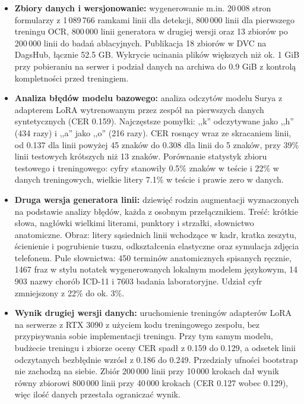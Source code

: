 \begin{itemize}
	\item \textbf{Zbiory danych i wersjonowanie:} wygenerowanie m.in.
	20\,008 stron formularzy z 1\,089\,766 ramkami linii dla detekcji,
	800\,000 linii dla pierwszego treningu OCR, 800\,000 linii generatora
	w drugiej wersji oraz 13 zbiorów po 200\,000 linii do badań ablacyjnych.
	Publikacja 18 zbiorów w DVC na DagsHub, łącznie 52.5 GB. Wykrycie ucinania plików
	większych niż ok. 1 GiB przy pobieraniu na serwer i podział danych
	na archiwa do 0.9 GiB z kontrolą kompletności przed treningiem.

	\item \textbf{Analiza błędów modelu bazowego:} analiza odczytów modelu
	Surya z adapterem LoRA wytrenowanym przez zespół na pierwszych danych
	syntetycznych (CER 0.159). Najczęstsze pomyłki: ,,k'' odczytywane jako
	,,h'' (434 razy) i ,,a'' jako ,,o'' (216 razy). CER rosnący wraz ze
	skracaniem linii, od 0.137 dla linii powyżej 45 znaków do 0.308 dla
	linii do 5 znaków, przy 39\% linii testowych krótszych niż 13 znaków.
	Porównanie statystyk zbioru testowego i treningowego: cyfry stanowiły
	0.5\% znaków w teście i 22\% w danych treningowych, wielkie litery
	7.1\% w teście i prawie zero w danych.

	\item \textbf{Druga wersja generatora linii:} dziewięć rodzin augmentacji
	wyznaczonych na podstawie analizy błędów, każda z osobnym przełącznikiem.
	Treść: krótkie słowa, nagłówki wielkimi literami, punktory i strzałki,
	słownictwo anatomiczne. Obraz: litery sąsiednich linii wchodzące w kadr,
	kratka zeszytu, ścienienie i pogrubienie tuszu, odkształcenia elastyczne
	oraz symulacja zdjęcia telefonem. Pule słownictwa: 450 terminów
	anatomicznych spisanych ręcznie, 1467 fraz w stylu notatek wygenerowanych
	lokalnym modelem językowym, 14\,903 nazwy chorób ICD-11 i 7603 badania
	laboratoryjne. Udział cyfr zmniejszony z 22\% do ok. 3\%.

	\item \textbf{Wynik drugiej wersji danych:} uruchomienie treningów
	adapterów LoRA na serwerze z RTX 3090 z użyciem kodu treningowego
	zespołu, bez przypisywania sobie implementacji treningu. Przy tym samym
	modelu, budżecie treningu i zbiorze oceny CER spadł z 0.159 do 0.129,
	a odsetek linii odczytanych bezbłędnie wzrósł z 0.186 do 0.249.
	Przedziały ufności bootstrap nie zachodzą na siebie. Zbiór 200\,000 linii
	przy 10\,000 krokach dał wynik równy zbiorowi 800\,000 linii przy
	40\,000 krokach (CER 0.127 wobec 0.129), więc ilość danych przestała
	ograniczać wynik.


\end{itemize}
